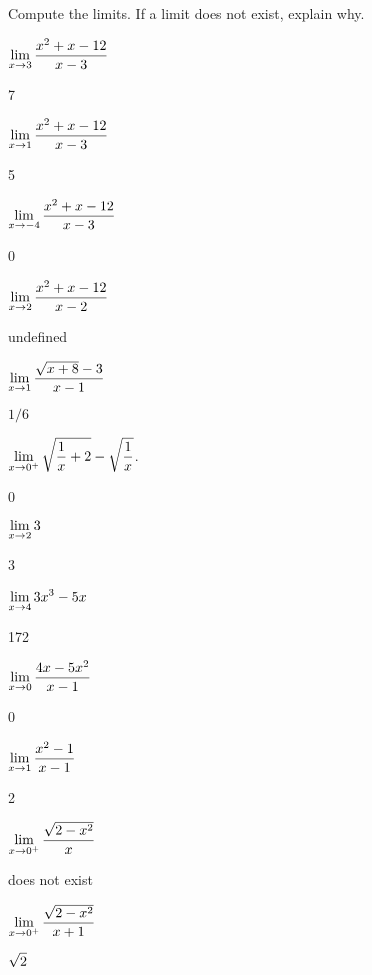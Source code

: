 \begin{exercises}

Compute the limits. If a limit does not exist, explain why.

\twocol

\exercise $\displaystyle \lim_{x\to 3}{x^2+x-12\over x-3}$
\begin{answer} 7
\end{answer}

\exercise $\displaystyle \lim_{x\to 1}{x^2+x-12\over x-3}$
\begin{answer} 5
\end{answer}

\exercise $\displaystyle \lim_{x\to -4}{x^2+x-12\over x-3}$
\begin{answer} 0
\end{answer}

\exercise $\displaystyle \lim_{x\to 2} {x^2+x-12\over x-2}$
\begin{answer} undefined
\end{answer}

\exercise $\displaystyle \lim_{x\to 1} {\sqrt{x+8}-3\over x-1}$
\begin{answer} $1/6$
\end{answer}

\exercise $\displaystyle \lim_{x\to 0^+} \sqrt{{1\over x}+2} - \sqrt{1\over x}$.
\begin{answer} 0
\end{answer}

\exercise $\displaystyle\lim _{x\to 2} 3$
\begin{answer} 3
\end{answer}

\exercise $\displaystyle\lim _{x\to 4 } 3x^3 - 5x $
\begin{answer} 172
\end{answer}

\exercise $\displaystyle \lim _{x\to 0 } {4x - 5x^2\over x-1}$
\begin{answer} 0
\end{answer}

\exercise $\displaystyle\lim _{x\to 1 } {x^2 -1 \over x-1 }$
\begin{answer} 2
\end{answer}

\exercise $\displaystyle\lim _{x\to 0^ + } {\sqrt{2-x^2 }\over x}$
\begin{answer} does not exist
\end{answer}

\exercise $\displaystyle\lim _{x\to 0^ + } {\sqrt{2-x^2}\over x+1}$
\begin{answer} $\displaystyle \sqrt2$
\end{answer}


\end{exercises}
